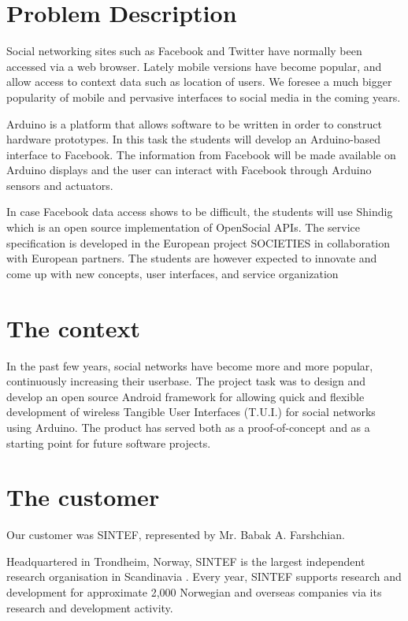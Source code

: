 \section{Problem Description}
Social networking sites such as Facebook and Twitter have normally been accessed  via a web browser.
Lately mobile versions have become popular, and allow access to context data such as location of
users. We foresee a much bigger popularity of mobile and pervasive interfaces to social media in
the coming years.

Arduino\cite{link:arduino} is a platform that allows software to be written in order to construct
hardware prototypes. In this task the students will develop an Arduino-based interface to Facebook.
The information from Facebook will be made available on Arduino displays and the user can interact
with Facebook through Arduino sensors and actuators.

In case Facebook data access shows to be difficult, the students will use Shindig\cite{link:shinding} which 
is an open source implementation of OpenSocial APIs. The service specification is developed in the European project 
SOCIETIES in collaboration with European partners. The students are however expected to innovate and come up 
with new concepts, user interfaces, and service organization

\section{The context}
In the past few years, social networks have become more and more popular, continuously increasing their userbase.
The project task was to design and develop an open source Android\cite{link:android} framework for allowing quick
and flexible development of wireless Tangible User Interfaces (T.U.I.) for social networks using Arduino.
The product has served both as a proof-of-concept and as a starting point for future software projects.

\section{The customer}
Our customer was SINTEF, represented by Mr. Babak A. Farshchian.

Headquartered in Trondheim, Norway, SINTEF is the largest independent research organisation in Scandinavia \cite{link:sintef}.
Every year, SINTEF supports research and development for approximate 2,000 Norwegian and overseas
companies via its research and development activity.


